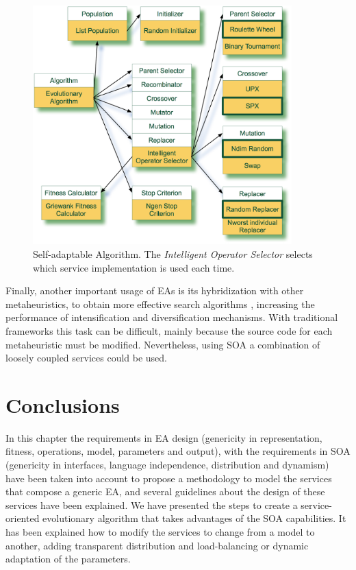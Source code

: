 \begin{figure}
\centering
\includegraphics[width=10cm]{gfx/soaea/intelligent.jpg}
\caption{Self-adaptable Algorithm. The {\em Intelligent Operator Selector} selects which service implementation is used each time.}
\label{INTELLIGENTALGORITHM}
\end{figure}


Finally, another important usage of EAs is its hybridization with other metaheuristics, to obtain more effective search algorithms \cite{HybridRodriguez2012},  increasing the performance of intensification and diversification mechanisms. With  traditional frameworks this task can be difficult, mainly because the source code for each metaheuristic must be modified. Nevertheless, using SOA a combination of loosely coupled services could be used.

\section{Conclusions}
In this chapter the requirements in EA design (genericity in representation, fitness, operations, model, parameters and output), with the requirements in SOA (genericity in interfaces, language independence, distribution and dynamism) have been taken into account to propose a methodology to model the services that compose a generic EA, and several guidelines about the design of these services have been explained. We have presented the steps to create a service-oriented evolutionary algorithm that takes advantages of the SOA capabilities. It has been explained how to modify the services to change from a model to another, adding transparent distribution and load-balancing or dynamic adaptation of the parameters.

